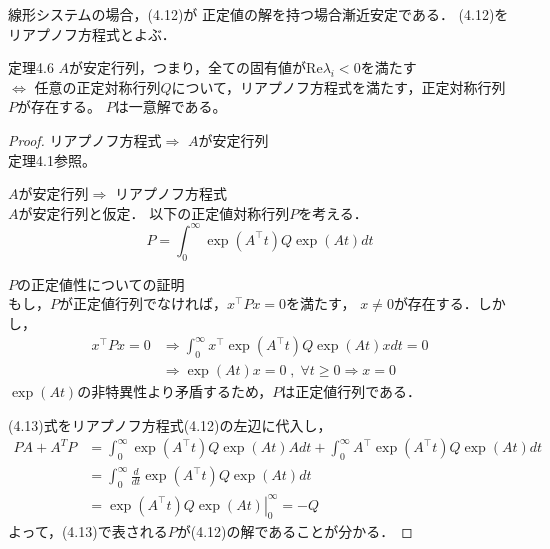 \documentclass{jsarticle}
\begin{document}
線形システムの場合，(4.12)が
正定値の解を持つ場合漸近安定である．
(4.12)をリアプノフ方程式とよぶ．

\begin{itembox}[l]{定理4.6}
  $A$が安定行列，つまり，全ての固有値が$\text{Re}\lambda_i <0$を満たす\\
  $\Leftrightarrow$
  任意の正定対称行列$Q$について，リアプノフ方程式を満たす，正定対称行列$P$が存在する。
  $P$は一意解である。
\end{itembox}
\begin{proof}
  リアプノフ方程式$\Rightarrow$ $A$が安定行列\\
  定理4.1参照。

  $A$が安定行列$\Rightarrow$ リアプノフ方程式\\
  $A$が安定行列と仮定．
  以下の正定値対称行列$P$を考える．
  \begin{equation*}
    P= \int^\infty_0 \exp(A^\top t)Q \exp(At)dt \tag{4.13}
  \end{equation*}

  $P$の正定値性についての証明\\
  もし，$P$が正定値行列でなければ，$x^\top Px=0$を満たす，
  $x\neq 0$が存在する．しかし，
  \begin{align*}
    x^\top P x = 0 &\Rightarrow \int^\infty_0 x^\top\exp(A^\top t)Q \exp(At)xdt =0\\
    & \Rightarrow \exp(At)x = 0\;,\;\forall t\geq 0 \Rightarrow x=0
  \end{align*}
  $\exp(At)$の非特異性より矛盾するため，$P$は正定値行列である．

  (4.13)式をリアプノフ方程式(4.12)の左辺に代入し，
  \begin{align*}
    PA + A^T P &= \int_{0}^{\infty} \exp({A^\top t}) Q \exp({A t}) A dt + \int_{0}^{\infty} A^\top\exp({A^\top t}) Q \exp({A t}) dt\\
    &= \int_{0}^{\infty} \frac{d}{dt} \exp({A^\top t}) Q \exp({A t}) dt \\
    &= \left. \exp({A^\top t}) Q \exp({A t}) \right|_{0}^{\infty} = - Q
  \end{align*}
  よって，(4.13)で表される$P$が(4.12)の解であることが分かる．


\end{proof}
\end{document}
